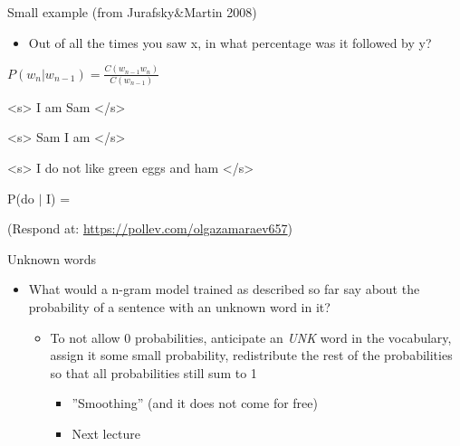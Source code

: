 \documentclass{beamer}
\begin{document}
 \begin{frame}{Small example (from Jurafsky\&Martin 2008)}

 \begin{itemize}
 \item Out of all the times you saw x, in what percentage was it followed by y?
 \end{itemize}

 \vspace{0.5cm}

 \begin{center}
 $P(w_n\vert w_{n-1}) = \frac{C(w_{n-1}w_n)}{C(w_{n-1})}$
 \end{center}

 \vspace{0.5cm}

 <s> I am Sam </s>

 <s> Sam I am </s>

 <s> I do not like green eggs and ham </s> 

 \vspace{0.5cm}

 P(do $\vert$ I) = 

 \vspace{0.5cm}

 {\small (Respond at: \url{https://pollev.com/olgazamaraev657})}

 \end{frame}

 
 \begin{frame}{Unknown words}
 \begin{itemize}
 \item What would a n-gram model trained as described so far say about the probability of a sentence with an unknown word in it?
 \begin{itemize}
 \pause
 \item To not allow 0 probabilities, anticipate an {\it UNK} word in the vocabulary, assign it some small probability, redistribute the rest of the probabilities so that all probabilities still sum to 1
 \begin{itemize}
     \item ''Smoothing'' (and it does not come for free)
     \item Next lecture
 \end{itemize}
 \end{itemize}
 \end{itemize}
 \end{frame}
\end{document}
